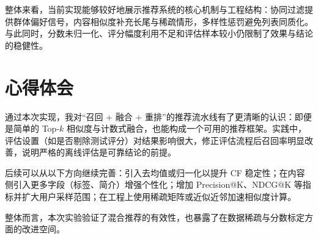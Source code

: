 整体来看，当前实现能够较好地展示推荐系统的核心机制与工程结构：协同过滤提供群体偏好信号，内容相似度补充长尾与稀疏情形，多样性惩罚避免列表同质化。与此同时，分数未归一化、评分幅度利用不足和评估样本较小仍限制了效果与结论的稳健性。

\section{心得体会}
通过本次实现，我对“召回 + 融合 + 重排”的推荐流水线有了更清晰的认识：即便是简单的 Top-$k$ 相似度与计数式融合，也能构成一个可用的推荐框架。实践中，评估设置（如是否剔除测试评分）对结果影响很大，修正评估流程后召回率明显改善，说明严格的离线评估是可靠结论的前提。

后续可以从以下方向继续完善：引入去均值或归一化以提升 CF 稳定性；在内容侧引入更多字段（标签、简介）增强个性化；增加 Precision@K、NDCG@K 等指标并扩大用户采样范围；在工程上使用稀疏矩阵或近似近邻加速相似度计算。

整体而言，本次实验验证了混合推荐的有效性，也暴露了在数据稀疏与分数标定方面的改进空间。
